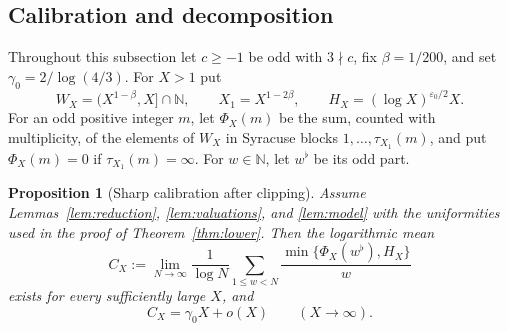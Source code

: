 \documentclass[12pt]{amsart}
\newtheorem{proposition}{Proposition}
\theoremstyle{definition}
\theoremstyle{remark}
\newcommand{\N}{\mathbb{N}}
\begin{document}
\subsection{Calibration and decomposition}
\label{subsec:clipped-calibration}
Throughout this subsection let $c\ge-1$ be odd with $3\nmid c$, fix
$\beta=1/200$, and set $\gamma_0=2/\log(4/3)$.
For $X>1$ put
\[
 W_X=(X^{1-\beta},X]\cap\N,\qquad X_1=X^{1-2\beta},\qquad
 H_X=(\log X)^{\varepsilon_0/2}X.
\]
For an odd positive integer $m$, let $\Phi_X(m)$ be the sum, counted
with multiplicity, of the elements of $W_X$ in Syracuse blocks
$1,\ldots,\tau_{X_1}(m)$, and put $\Phi_X(m)=0$ if
$\tau_{X_1}(m)=\infty$. For $w\in\N$, let $w^\flat$ be its odd part.
\begin{proposition}[Sharp calibration after clipping]
\label{prop:clipped-calibration}
Assume Lemmas~\ref{lem:reduction}, \ref{lem:valuations}, and
\ref{lem:model} with the uniformities used in the proof of
Theorem~\ref{thm:lower}. Then the logarithmic mean
\[
 C_X:=\lim_{N\to\infty}\frac1{\log N}
 \sum_{1\le w<N}\frac{\min\{\Phi_X(w^\flat),H_X\}}{w}
\]
exists for every sufficiently large $X$, and
\begin{equation}\label{eq:clipped-calibration}
 \boxed{C_X=\gamma_0 X+o(X)\qquad(X\to\infty).}
\end{equation}
\end{proposition}
\end{document}
